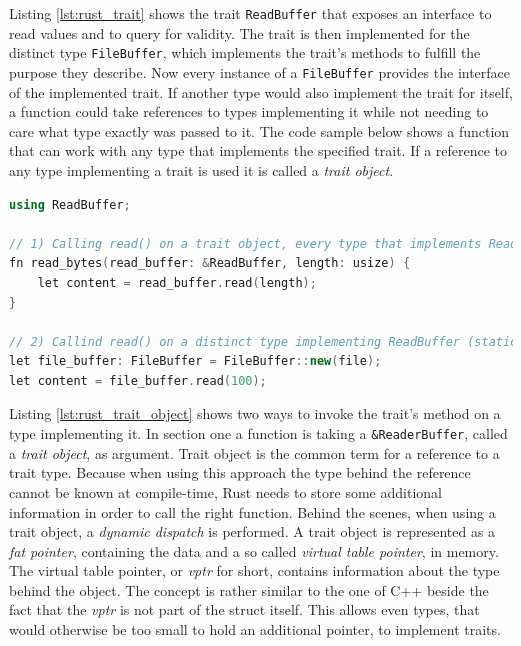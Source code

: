 \noindent
Listing \ref{lst:rust_trait} shows the trait \texttt{ReadBuffer} that exposes an interface to read values and to query for validity. The trait is then implemented for the distinct type \texttt{FileBuffer}, which implements the trait's methods to fulfill the purpose they describe. Now every instance of a \texttt{FileBuffer} provides the interface of the implemented trait. If another type would also implement the trait for itself, a function could take references to types implementing it while not needing to care what type exactly was passed to it. The code sample below shows a function that can work with any type that implements the specified trait. If a reference to any type implementing a trait is used it is called a \textit{trait object}.\\

\begin{lstlisting}[caption={A function, taking a trait object}, label={lst:rust_trait_object}, language=C++]
using ReadBuffer;

// 1) Calling read() on a trait object, every type that implements ReadBuffer (dynamic dispatch)
fn read_bytes(read_buffer: &ReadBuffer, length: usize) {
	let content = read_buffer.read(length);
}

// 2) Callind read() on a distinct type implementing ReadBuffer (static dispatch)
let file_buffer: FileBuffer = FileBuffer::new(file);
let content = file_buffer.read(100);
\end{lstlisting}

\noindent
Listing \ref{lst:rust_trait_object} shows two ways to invoke the trait's method on a type implementing it. In section one a function is taking a \texttt{\&ReaderBuffer}, called a \textit{trait object}, as argument. Trait object is the common term for a reference to a trait type. Because when using this approach the type behind the reference cannot be known at compile-time, Rust needs to store some additional information in order to call the right function. Behind the scenes, when using a trait object, a \textit{dynamic dispatch} is performed. A trait object is represented as a \textit{fat pointer}, containing the data and a so called \textit{virtual table pointer}, in memory. The virtual table pointer, or \textit{vptr} for short, contains information about the type behind the object. The concept is rather similar to the one of C++ beside the fact that the \textit{vptr} is not part of the struct itself. This allows even types, that would otherwise be too small to hold an additional pointer, to implement traits.\\

